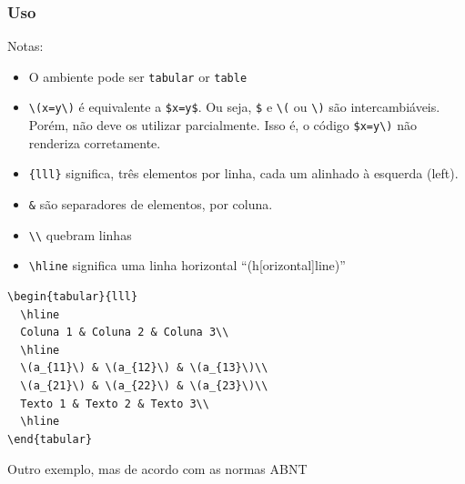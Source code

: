 \documentclass[11pt]{article}
\begin{document}
\subsubsection{Uso}
\label{sec:org0d935c2}
Notas:
\begin{itemize}
\item O ambiente pode ser \texttt{tabular} or \texttt{table}
\item \texttt{\textbackslash{}(x=y\textbackslash{})} é equivalente a \texttt{\$x=y\$}. Ou seja, \texttt{\$} e \texttt{\textbackslash{}(} ou \texttt{\textbackslash{})} são intercambiáveis. Porém, não deve os utilizar parcialmente. Isso é, o código \texttt{\$x=y\textbackslash{})} não renderiza corretamente.
\item \texttt{\{lll\}} significa, três elementos por linha, cada um alinhado à esquerda (left).
\item \texttt{\&} são separadores de elementos, por coluna.
\item \texttt{\textbackslash{}\textbackslash{}} quebram linhas
\item \texttt{\textbackslash{}hline} significa uma linha horizontal ``(h[orizontal]line)''
\end{itemize}

\begin{verbatim}
\begin{tabular}{lll}
  \hline
  Coluna 1 & Coluna 2 & Coluna 3\\
  \hline
  \(a_{11}\) & \(a_{12}\) & \(a_{13}\)\\
  \(a_{21}\) & \(a_{22}\) & \(a_{23}\)\\
  Texto 1 & Texto 2 & Texto 3\\
  \hline
\end{tabular}
\end{verbatim}

Outro exemplo, mas de acordo com as normas ABNT
\end{document}

